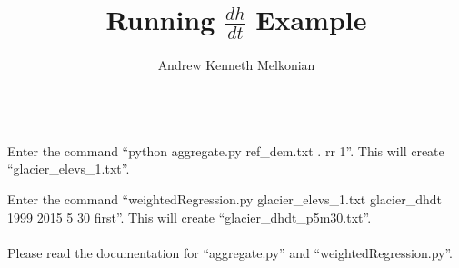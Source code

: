 \documentclass[12pt]{article}
\title{Running $\frac{dh}{dt}$ Example}
\author{Andrew Kenneth Melkonian}
\begin{document}
\maketitle

 \\

 Enter the command ``python aggregate.py ref\_dem.txt . rr 1''. This will create ``glacier\_elevs\_1.txt''.

 Enter the command ``weightedRegression.py glacier\_elevs\_1.txt glacier\_dhdt 1999 2015 5 30 first''. This will create ``glacier\_dhdt\_p5m30.txt''. \\

 \\

\noindent Please read the documentation for ``aggregate.py'' and ``weightedRegression.py''.
\end{document}
